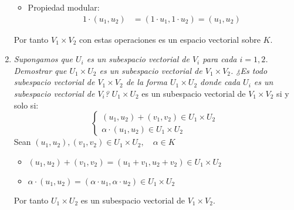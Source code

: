 \begin{ejercicio}
\begin{enumerate}
\begin{itemize}
			      \item Propiedad modular:
			            \begin{align*}
				            1 \cdot (u_1,u_2) & = (1 \cdot u_1,1 \cdot u_2) = (u_1,u_2)
			            \end{align*}
		      \end{itemize}
		      Por tanto $V_1 \times V_2$ con estas operaciones es un espacio vectorial sobre $K$.
		\item \textit{Supongamos que $U_i$ es un subespacio vectorial de $V_i$ para cada $i = 1, 2$. Demostrar que $U_1 \times U_2$ es un subespacio vectorial de $V_1 \times V_2$. ¿Es todo subespacio vectorial de $V_1 \times V_2$ de la forma $U_1 \times U_2$ donde cada $U_i$ es un subespacio vectorial de $V_i$?}
		      $U_1 \times U_2$ es un subespacio vectorial de $V_1 \times V_2$ si y solo si:
		      \begin{equation*}
			      \begin{cases}
				      (u_1,u_2) + (v_1,v_2) \in U_1 \times U_2 \\
				      \alpha \cdot (u_1,u_2) \in U_1 \times U_2
			      \end{cases}
		      \end{equation*}
		      Sean $(u_1,u_2),(v_1,v_2) \in U_1 \times U_2, \quad \alpha \in K$
		      \begin{itemize}
			      \item $(u_1,u_2) + (v_1,v_2) = (u_1 + v_1,u_2 + v_2) \in U_1 \times U_2$
			      \item $\alpha \cdot (u_1,u_2) = (\alpha \cdot u_1,\alpha \cdot u_2) \in U_1 \times U_2$
		      \end{itemize}
		      Por tanto $U_1 \times U_2$ es un subespacio vectorial de $V_1 \times V_2$.\\
	\end{enumerate}

\end{ejercicio}


